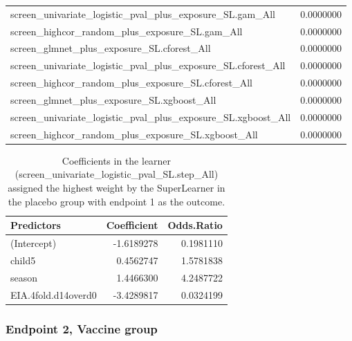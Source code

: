 \documentclass[11pt]{article}
\begin{document}
\begin{table}[!h]
\begin{tabular}[t]{lr}
screen\_univariate\_logistic\_pval\_plus\_exposure\_SL.gam\_All & 0.0000000\\
screen\_highcor\_random\_plus\_exposure\_SL.gam\_All & 0.0000000\\
screen\_glmnet\_plus\_exposure\_SL.cforest\_All & 0.0000000\\
screen\_univariate\_logistic\_pval\_plus\_exposure\_SL.cforest\_All & 0.0000000\\
screen\_highcor\_random\_plus\_exposure\_SL.cforest\_All & 0.0000000\\
screen\_glmnet\_plus\_exposure\_SL.xgboost\_All & 0.0000000\\
screen\_univariate\_logistic\_pval\_plus\_exposure\_SL.xgboost\_All & 0.0000000\\
screen\_highcor\_random\_plus\_exposure\_SL.xgboost\_All & 0.0000000\\
\bottomrule
\end{tabular}
\end{table}

\begin{table}[!h]

\caption{\label{tab:y1plac4varsetEIAlogd14overd0learner}Coefficients in the learner (screen\_univariate\_logistic\_pval\_SL.step\_All) assigned the highest weight by the SuperLearner in the placebo group with endpoint 1 as the outcome.}
\centering
\fontsize{10}{12}\selectfont
\begin{tabular}[t]{lrr}
\toprule
Predictors & Coefficient & Odds.Ratio\\
\midrule
(Intercept) & -1.6189278 & 0.1981110\\
child5 & 0.4562747 & 1.5781838\\
season & 1.4466300 & 4.2487722\\
EIA.4fold.d14overd0 & -3.4289817 & 0.0324199\\
\bottomrule
\end{tabular}
\end{table}

\clearpage

\hypertarget{endpoint-2-vaccine-group}{%
\subsubsection{Endpoint 2, Vaccine group}\label{endpoint-2-vaccine-group}}
\end{document}

